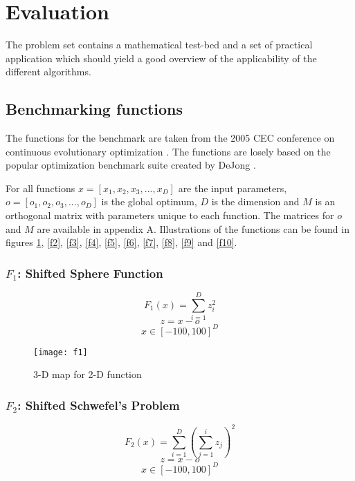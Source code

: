 \section{Evaluation}

The problem set contains a mathematical test-bed and a set of practical application which should yield a good overview of the applicability of the different algorithms.


\subsection{Benchmarking functions}

The functions for the benchmark are taken from the 2005 CEC conference on continuous evolutionary optimization \cite{suganthan2005problem}. The functions are losely based on the popular optimization benchmark suite created by DeJong \cite{Whitley1996245}.

For all functions $x=[x_1,x_2,x_3,...,x_D]$ are the input parameters, $o=[o_1,o_2,o_3,...,o_D]$ is the global optimum, $D$ is the dimension and $M$ is an orthogonal matrix with parameters unique to each function. The matrices for $o$ and $M$ are available in appendix A. Illustrations of the functions can be found in figures \ref{f1}, \ref{f2}, \ref{f3}, \ref{f4}, \ref{f5}, \ref{f6}, \ref{f7}, \ref{f8}, \ref{f9} and \ref{f10}.

\subsubsection{$F_1$: Shifted Sphere Function}

\begin{equation}
  F_1(x)=\sum_{i=1}^{D}{z_i^2}
\end{equation}
\[ z=x-o \]
\[ x \in [-100,100]^D \]

\begin{figure}[H]
  \centering
  \texttt{[image: f1]}
  \caption{3-D map for 2-D function}
  \label{f1}
\end{figure}

\subsubsection{$F_2$: Shifted Schwefel’s Problem}

\begin{equation}
  F_2(x)=\sum_{i=1}^{D}{(\sum_{j=1}^{i}{z_j})^2}
\end{equation}
\[ z=x-o \]
\[ x \in [-100,100]^D \]

